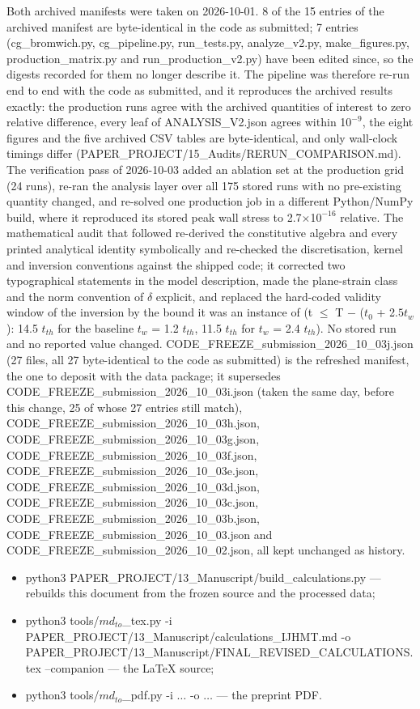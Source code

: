 \documentclass[preprint,12pt]{elsarticle}
\begin{document}
Both archived manifests were taken on 2026-10-01. 8 of the 15 entries of the archived manifest are byte-identical in the code as submitted; 7 entries (cg\_bromwich.py, cg\_pipeline.py, run\_tests.py, analyze\_v2.py, make\_figures.py, production\_matrix.py and run\_production\_v2.py) have been edited since, so the digests recorded for them no longer describe it. The pipeline was therefore re-run end to end with the code as submitted, and it reproduces the archived results exactly: the production runs agree with the archived quantities of interest to zero relative difference, every leaf of ANALYSIS\_V2.json agrees within 1$0^{-9}$, the eight figures and the five archived CSV tables are byte-identical, and only wall-clock timings differ (PAPER\_PROJECT/15\_Audits/RERUN\_COMPARISON.md). The verification pass of 2026-10-03 added an ablation set at the production grid (24 runs), re-ran the analysis layer over all 175 stored runs with no pre-existing quantity changed, and re-solved one production job in a different Python/NumPy build, where it reproduced its stored peak wall stress to 2.7$\times$1$0^{-16}$ relative. The mathematical audit that followed re-derived the constitutive algebra and every printed analytical identity symbolically and re-checked the discretisation, kernel and inversion conventions against the shipped code; it corrected two typographical statements in the model description, made the plane-strain class and the norm convention of $\delta$ explicit, and replaced the hard-coded validity window of the inversion by the bound it was an instance of (t $\leq$ T $-$ ($t_{0}$ + 2.$5t_{w}$): 14.5 $t_{th}$ for the baseline $t_{w}$ = 1.2 $t_{th}$, 11.5 $t_{th}$ for $t_{w}$ = 2.4 $t_{th}$). No stored run and no reported value changed. CODE\_FREEZE\_submission\_2026\_10\_03j.json (27 files, all 27 byte-identical to the code as submitted) is the refreshed manifest, the one to deposit with the data package; it supersedes CODE\_FREEZE\_submission\_2026\_10\_03i.json (taken the same day, before this change, 25 of whose 27 entries still match), CODE\_FREEZE\_submission\_2026\_10\_03h.json, CODE\_FREEZE\_submission\_2026\_10\_03g.json, CODE\_FREEZE\_submission\_2026\_10\_03f.json, CODE\_FREEZE\_submission\_2026\_10\_03e.json, CODE\_FREEZE\_submission\_2026\_10\_03d.json, CODE\_FREEZE\_submission\_2026\_10\_03c.json, CODE\_FREEZE\_submission\_2026\_10\_03b.json, CODE\_FREEZE\_submission\_2026\_10\_03.json and CODE\_FREEZE\_submission\_2026\_10\_02.json, all kept unchanged as history.

\begin{itemize}
\item python3 PAPER\_PROJECT/13\_Manuscript/build\_calculations.py --- rebuilds this document from the frozen source and the processed data;
\item python3 tools/$md_{to}$\_tex.py -i PAPER\_PROJECT/13\_Manuscript/calculations\_IJHMT.md -o PAPER\_PROJECT/13\_Manuscript/FINAL\_REVISED\_CALCULATIONS.tex --companion --- the LaTeX source;
\item python3 tools/$md_{to}$\_pdf.py -i $\ldots$ -o $\ldots$ --- the preprint PDF.
\end{itemize}
\end{document}
